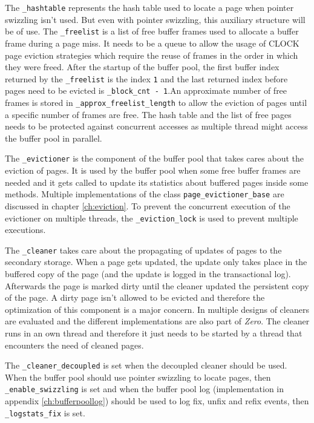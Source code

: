 	The \lstinline{_hashtable} represents the hash table used to locate a page when pointer swizzling isn't used. But even with pointer swizzling, this auxiliary structure will be of use. The \lstinline{_freelist} is a list of free buffer frames used to allocate a buffer frame during a page miss. It needs to be a queue to allow the usage of CLOCK page eviction strategies which require the reuse of frames in the order in which they were freed. After the startup of the buffer pool, the first buffer index returned by the \lstinline{_freelist} is the index \lstinline{1} and the last returned index before pages need to be evicted is \lstinline{_block_cnt - 1}.An approximate number of free frames is stored in \lstinline{_approx_freelist_length} to allow the eviction of pages until a specific number of frames are free. The hash table and the list of free pages needs to be protected against concurrent accesses as multiple thread might access the buffer pool in parallel.
	
	The \lstinline{_evictioner} is the component of the buffer pool that takes cares about the eviction of pages. It is used by the buffer pool when some free buffer frames are needed and it gets called to update its statistics about buffered pages inside some methods. Multiple implementations of the class \lstinline{page_evictioner_base} are discussed in chapter \ref{ch:eviction}. To prevent the concurrent execution of the evictioner on multiple threads, the \lstinline{_eviction_lock} is used to prevent multiple executions.
	
	The \lstinline{_cleaner} takes care about the propagating of updates of pages to the secondary storage. When a page gets updated, the update only takes place in the buffered copy of the page (and the update is logged in the transactional log). Afterwards the page is marked dirty until the cleaner updated the persistent copy of the page. A dirty page isn't allowed to be evicted and therefore the optimization of this component is a major concern. In \cite{Sauer:2016} multiple designs of cleaners are evaluated and the different implementations are also part of \emph{Zero}. The cleaner runs in an own thread and therefore it just needs to be started by a thread that encounters the need of cleaned pages.
	
	The \lstinline{_cleaner_decoupled} is set when the decoupled cleaner should be used. When the buffer pool should use pointer swizzling to locate pages, then \lstinline{_enable_swizzling} is set and when the buffer pool log (implementation in appendix \ref{ch:bufferpoollog}) should be used to log fix, unfix and refix events, then \lstinline{_logstats_fix} is set.
	
